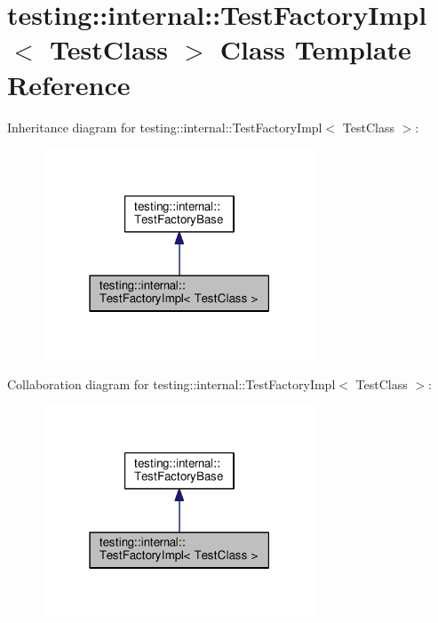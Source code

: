 \hypertarget{classtesting_1_1internal_1_1TestFactoryImpl}{}\section{testing\+:\+:internal\+:\+:Test\+Factory\+Impl$<$ Test\+Class $>$ Class Template Reference}
\label{classtesting_1_1internal_1_1TestFactoryImpl}


Inheritance diagram for testing\+:\+:internal\+:\+:Test\+Factory\+Impl$<$ Test\+Class $>$\+:\nopagebreak
\begin{figure}[H]
\begin{center}
\leavevmode
\includegraphics[width=231pt]{classtesting_1_1internal_1_1TestFactoryImpl__inherit__graph}
\end{center}
\end{figure}


Collaboration diagram for testing\+:\+:internal\+:\+:Test\+Factory\+Impl$<$ Test\+Class $>$\+:\nopagebreak
\begin{figure}[H]
\begin{center}
\leavevmode
\includegraphics[width=231pt]{classtesting_1_1internal_1_1TestFactoryImpl__coll__graph}
\end{center}
\end{figure}
